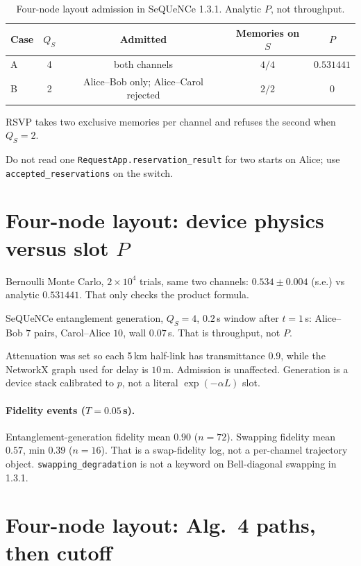 \documentclass[11pt]{article}
\begin{document}
\begin{table}[h]
\centering
\caption{Four-node layout admission in SeQUeNCe 1.3.1. Analytic $P$, not throughput.}
\label{tab:fig4a}
\begin{tabular}{@{}lcccc@{}}
\toprule
Case & $Q_S$ & Admitted & Memories on $S$ & $P$ \\
\midrule
A & 4 & both channels & $4/4$ & $0.531441$ \\
B & 2 & Alice--Bob only; Alice--Carol rejected & $2/2$ & $0$ \\
\bottomrule
\end{tabular}
\end{table}

RSVP takes two exclusive memories per channel and refuses the second when $Q_S=2$.

Do not read one \texttt{RequestApp.reservation\_result} for two starts on Alice; use \texttt{accepted\_reservations} on the switch.

\section{Four-node layout: device physics versus slot $P$}
\label{sec:physics}

Bernoulli Monte Carlo, $2\times 10^4$ trials, same two channels: $0.534\pm 0.004$ (s.e.) vs analytic $0.531441$.
That only checks the product formula.

SeQUeNCe entanglement generation, $Q_S=4$, $0.2$\,s window after $t=1$\,s: Alice--Bob $7$ pairs, Carol--Alice $10$, wall $0.07$\,s.
That is throughput, not $P$.

Attenuation was set so each 5\,km half-link has transmittance $0.9$, while the NetworkX graph used for delay is $10$\,m.
Admission is unaffected.
Generation is a device stack calibrated to $p$, not a literal $\exp(-\alpha L)$ slot.

\paragraph{Fidelity events ($T=0.05$\,s).}
Entanglement-generation fidelity mean $0.90$ ($n=72$).
Swapping fidelity mean $0.57$, min $0.39$ ($n=16$).
That is a swap-fidelity log, not a per-channel trajectory object.
\texttt{swapping\_degradation} is not a keyword on Bell-diagonal swapping in 1.3.1.

\section{Four-node layout: Alg.~4 paths, then cutoff}
\label{sec:inject}
\end{document}
